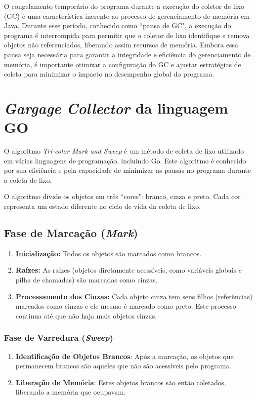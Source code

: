 \documentclass{article}
\begin{document}
    O congelamento temporário do programa durante a execução do coletor de lixo (GC) é uma característica inerente
    ao processo de gerenciamento de memória em Java. Durante esse período, conhecido como ``pausa de GC", a
    execução do programa é interrompida para permitir que o coletor de lixo identifique e remova objetos não
    referenciados, liberando assim recursos de memória. Embora essa pausa seja necessária para garantir a integridade
    e eficiência do gerenciamento de memória, é importante otimizar a configuração do GC e ajustar estratégias de
    coleta para minimizar o impacto no desempenho global do programa.

    \section*{\emph{Gargage Collector} da linguagem GO}

    O algoritmo \textit{Tri-color Mark and Sweep} é um método de coleta de lixo utilizado em várias linguagens de programação,
    incluindo Go. Este algoritmo é conhecido por sua eficiência e pela capacidade de minimizar as pausas no programa durante a coleta de lixo.

    O algoritmo divide os objetos em três ``cores": branco, cinza e preto. Cada cor representa um estado diferente
    no ciclo de vida da coleta de lixo.

    \subsection*{Fase de Marcação (\emph{Mark})}

    \begin{enumerate}
        \item \textbf{Inicialização:} Todos os objetos são marcados como brancos.
        \item \textbf{Raízes:} As raízes (objetos diretamente acessíveis, como variáveis globais e pilha de chamadas) são marcadas como cinzas.
        \item \textbf{Processamento dos Cinzas:} Cada objeto cinza tem seus filhos (referências) marcados como cinzas
        e ele mesmo é marcado como preto. Este processo continua até que não haja mais objetos cinzas.
    \end{enumerate}

    \subsubsection*{Fase de Varredura (\emph{Sweep})}
    \begin{enumerate}
        \item \textbf{Identificação de Objetos Brancos}: Após a marcação, os objetos que permanecem brancos
        são aqueles que não são acessíveis pelo programa.
        \item \textbf{Liberação de Memória}: Estes objetos brancos são então coletados, liberando a memória que ocupavam.
    \end{enumerate}
\end{document}
